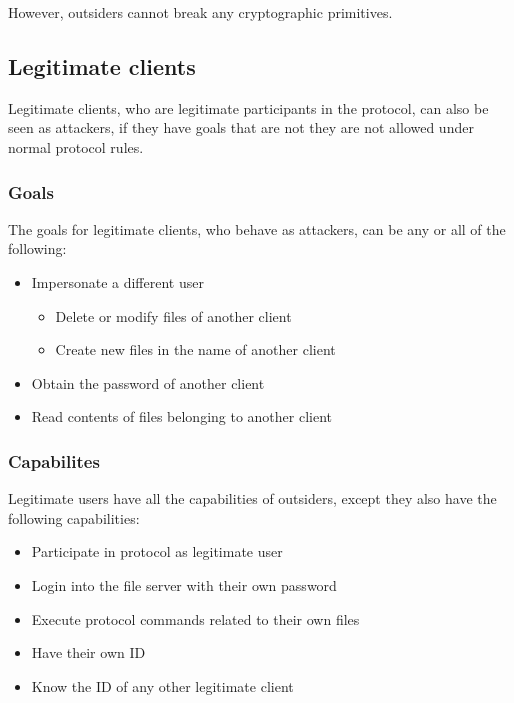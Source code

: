 \documentclass[12pt]{article}
\begin{document}
\noindent However, outsiders cannot break any cryptographic primitives.

\subsection{Legitimate clients}

Legitimate clients, who are legitimate participants in the protocol, can also be seen as attackers, if they have goals that are not they are not allowed under normal protocol rules.

\subsubsection{Goals}

The goals for legitimate clients, who behave as attackers, can be any or all of the following:

\begin{itemize}
    \item Impersonate a different user
    \begin{itemize}
        \item Delete or modify files of another client
        \item Create new files in the name of another client
    \end{itemize}
    \item Obtain the password of another client
    \item Read contents of files belonging to another client
\end{itemize}

\subsubsection{Capabilites}

Legitimate users have all the capabilities of outsiders, except they also have the following capabilities:

\begin{itemize}
    \item Participate in protocol as legitimate user
    \item Login into the file server with their own password
    \item Execute protocol commands related to their own files
    \item Have their own ID
    \item Know the ID of any other legitimate client

\end{itemize}
\end{document}
